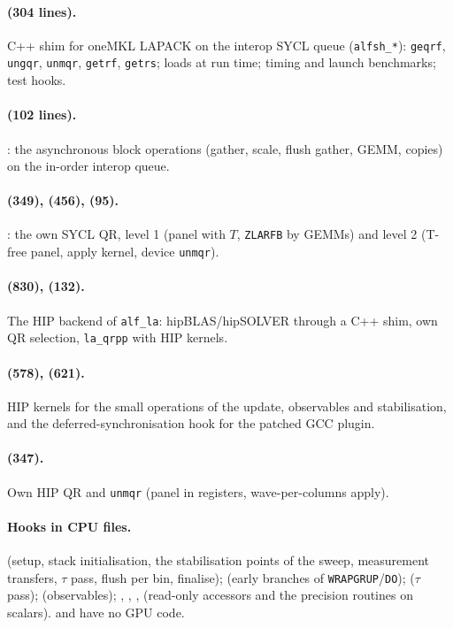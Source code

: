 \paragraph{ (304 lines).} C++ shim for oneMKL LAPACK on the interop SYCL queue (\texttt{alfsh\_*}): \texttt{geqrf}, \texttt{ungqr}, \texttt{unmqr}, \texttt{getrf}, \texttt{getrs}; loads  at run time; timing and launch benchmarks; test hooks.

\paragraph{ (102 lines).} : the asynchronous block operations (gather, scale, flush gather, GEMM, copies) on the in-order interop queue.

\paragraph{ (349),  (456),  (95).} : the own SYCL QR, level 1 (panel with $T$, \texttt{ZLARFB} by GEMMs) and level 2 (T-free panel, apply kernel, device \texttt{unmqr}).

\paragraph{ (830),  (132).} The HIP backend of \texttt{alf\_la}: hipBLAS/hipSOLVER through a C++ shim, own QR selection, \texttt{la\_qrpp} with HIP kernels.

\paragraph{ (578),  (621).} HIP kernels for the small operations of the update, observables and stabilisation, and the deferred-synchronisation hook for the patched GCC plugin.

\paragraph{ (347).} Own HIP QR and \texttt{unmqr} (panel in registers, wave-per-columns apply).

\paragraph{Hooks in CPU files.}  (setup, stack initialisation, the stabilisation points of the sweep, measurement transfers, $\tau$ pass, flush per bin, finalise);  (early branches of \texttt{WRAPGRUP}/\texttt{DO});  ($\tau$ pass);  (observables); , , ,  (read-only accessors and the precision routines on scalars).  and  have no GPU code.

